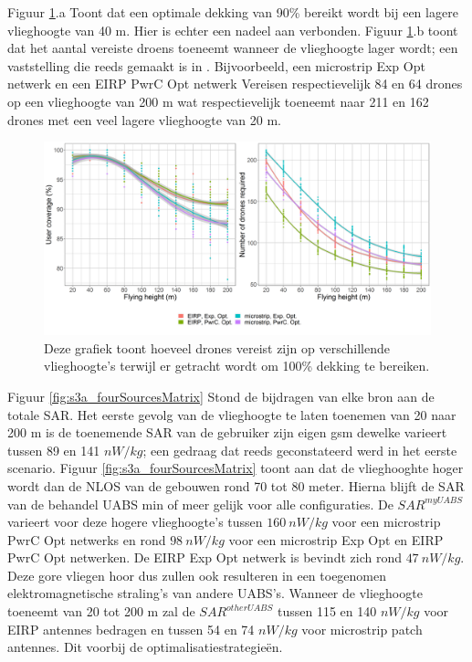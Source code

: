 \documentclass[twocolumn]{phdsymp_dutch}
\begin{document}
Figuur \ref{fig:s3a_numDronesAndCov}.a Toont dat een optimale dekking van 90\% bereikt wordt bij een lagere vlieghoogte van 40 m.
Hier is echter een nadeel aan verbonden. 
Figuur \ref{fig:s3a_numDronesAndCov}.b 
toont dat het aantal vereiste droens toeneemt wanneer de vlieghoogte lager wordt; 
een vaststelling die reeds gemaakt is in \cite{J2}.
Bijvoorbeeld, een microstrip \gls{Exp Opt} netwerk en een \gls{EIRP} \gls{PwrC Opt} netwerk 
Vereisen respectievelijk 84 en 64 drones op een vlieghoogte van 200 m wat respectievelijk toeneemt naar 
211 en 162 drones met een veel lagere vlieghoogte van 20 m.

\begin{figure}[]
  \includegraphics[width=\linewidth]{../results/s3/fhvsnumdronesAndCov.png}
  \caption{Deze grafiek toont hoeveel drones vereist zijn op verschillende vlieghoogte's terwijl er getracht wordt om 100\% dekking te bereiken.}
  \label{fig:s3a_numDronesAndCov}
\end{figure}

Figuur \ref{fig:s3a_fourSourcesMatrix} Stond de bijdragen van elke bron aan de totale \gls{SAR}.
Het eerste  gevolg van de vlieghoogte te laten toenemen van 20 naar 200 m is de 
toenemende  \gls{SAR}  van de gebruiker zijn eigen gsm dewelke varieert tussen 89 en 141 $nW/kg$;
een gedraag dat reeds geconstateerd werd in het eerste scenario.
Figuur \ref{fig:s3a_fourSourcesMatrix} toont aan dat de vlieghooghte hoger wordt dan de \gls{NLOS} van de gebouwen 
rond 70 tot 80 meter. Hierna blijft de \gls{SAR} van de behandel \gls{UABS} min of meer gelijk voor alle configuraties.
De $SAR^{myUABS}$ varieert voor deze hogere vlieghoogte's tussen
 $160\ nW/kg$ voor een microstrip \gls{PwrC Opt} netwerks en rond $98\ nW/kg$ voor een microstrip \gls{Exp Opt} en \gls{EIRP} \gls{PwrC Opt} netwerken.
De \gls{EIRP} \gls{Exp Opt} netwerk is bevindt zich rond $47\ nW/kg$.
Deze gore vliegen hoor dus zullen ook resulteren in een toegenomen elektromagnetische straling's van andere
\gls{UABS}'s.
Wanneer de vlieghoogte toeneemt van 20 tot 200 m zal de $SAR^{otherUABS}$ tussen 115 en 140
$nW/kg$ voor \gls{EIRP} antennes bedragen en tussen 54 en 74 $nW/kg$ voor microstrip patch antennes.
Dit voorbij de optimalisatiestrategie\"en.
\end{document}
